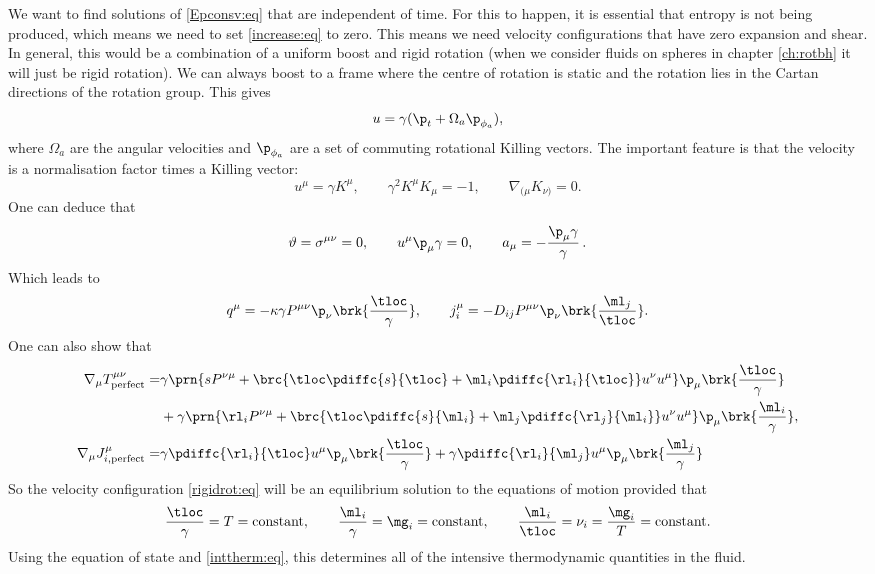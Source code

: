 We want to find solutions of \eqref{Epconsv:eq} that are independent of time. For this to happen, it is essential that entropy is not being produced, which means we need to set \eqref{increase:eq} to zero. This means we need velocity configurations that have zero expansion and shear. In general, this would be a combination of a uniform boost and rigid rotation (when we consider fluids on spheres in chapter \ref{ch:rotbh} it will just be rigid rotation). We can always boost to a frame where the centre of rotation is static and the rotation lies in the Cartan directions of the rotation group. This gives
%
\begin{equation}\label{rigidrot:eq}
  u = \gamma(\p_t + \Omega_a \p_{\phi_a}),
\end{equation}
%
where $\Omega_a$ are the angular velocities and $\p_{\phi_a}$ are a set of commuting rotational Killing vectors. The important feature is that the velocity is a normalisation factor times a Killing vector:
%
\begin{equation}\label{eqvel:eq}
  u^\mu = \gamma K^\mu, \qquad
  \gamma^2 K^\mu K_\mu = -1, \qquad
  \nabla_{(\mu} K_{\nu)} = 0.
\end{equation}
%
One can deduce that
%
\begin{equation*}
  \vartheta = \sigma^{\mu\nu}=0, \qquad
  u^\mu \p_\mu \gamma = 0, \qquad
  a_\mu = -\frac{\p_\mu \gamma}{\gamma}\,.
\end{equation*}
%
Which leads to
%
\begin{equation*}
  q^\mu = -\kappa \gamma P^{\mu\nu} \p_\nu \brk{\frac{\tloc}{\gamma}}, \qquad
  j^\mu_i = -D_{ij} P^{\mu\nu} \p_\nu \brk{\frac{\ml_j}{\tloc}}.
\end{equation*}
%
One can also show that
%
\begin{equation*}
\begin{split}
  \nabla_\mu T^{\mu\nu}_\mathrm{perfect} =&
    \gamma \prn{s P^{\nu\mu}
        + \brc{\tloc \pdiffc{s}{\tloc} + \ml_i \pdiffc{\rl_i}{\tloc}} u^\nu u^\mu}
       \p_\mu \brk{\frac{\tloc}{\gamma}}\\
   &+\gamma \prn{\rl_i P^{\nu\mu}
        + \brc{\tloc \pdiffc{s}{\ml_i} + \ml_j \pdiffc{\rl_j}{\ml_i}} u^\nu u^\mu}
       \p_\mu \brk{\frac{\ml_i}{\gamma}},\\
  \nabla_\mu J^\mu_{i,\text{perfect}} =&
   \gamma \pdiffc{\rl_i}{\tloc} u^\mu\p_\mu \brk{\frac{\tloc}{\gamma}}
   + \gamma \pdiffc{\rl_i}{\ml_j} u^\mu\p_\mu \brk{\frac{\ml_j}{\gamma}}
\end{split}
\end{equation*}
%
So the velocity configuration \eqref{rigidrot:eq} will be an equilibrium solution to the equations of motion provided that
%
\begin{equation}\label{rotsol:eq}
  \frac{\tloc}{\gamma} = T = \text{constant}, \qquad
  \frac{\ml_i}{\gamma} = \mg_i = \text{constant}, \qquad
  \frac{\ml_i}{\tloc} = \nu_i = \frac{\mg_i}{T} = \text{constant}.
\end{equation}
%
Using the equation of state and \eqref{inttherm:eq}, this determines all of the intensive thermodynamic quantities in the fluid.

